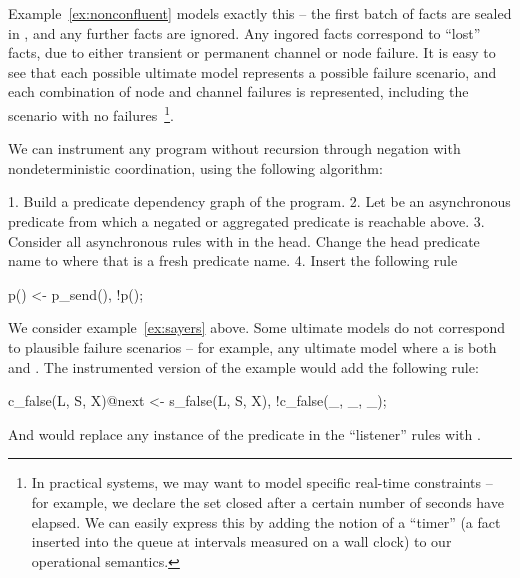 Example~\ref{ex:nonconfluent} models exactly this -- the first batch of  facts are sealed in , and any further  facts are ignored.  Any ingored  facts correspond to ``lost''  facts, due to either transient or permanent channel or node failure.  It is easy to see that each possible ultimate model represents a possible failure scenario, and each combination of node and channel failures is represented, including the scenario with no failures~\footnote{In practical systems, we may want to model specific real-time constraints -- for example, we declare the set closed after a certain number of seconds have elapsed.  We can easily express this by adding the notion of a ``timer'' (a fact inserted into the queue at intervals measured on a wall clock) to our operational semantics.}.

We can instrument any \lang program without recursion through negation with nondeterministic coordination, using the following algorithm:

1. Build a predicate dependency graph of the program.
2. Let  be an asynchronous predicate from which a negated or aggregated predicate is reachable above.
3. Consider all asynchronous rules with  in the head.  Change the head predicate name to  where that is a fresh predicate name.
4. Insert the following rule
\begin{Dedalus}
p() <- p_send(), !p(\dbar{_});
\end{Dedalus}

We consider example~\ref{ex:sayers} above.  Some ultimate models do not correspond to plausible failure scenarios -- for example, any ultimate model where a  is both  and .  The instrumented version of the example would add the following rule:

\begin{Dedalus}
c_false(L, S, X)@next <- s_false(L, S, X),
                         !c_false(_, _, _);
\end{Dedalus}

And would replace any instance of the predicate  in the ``listener'' rules with .
